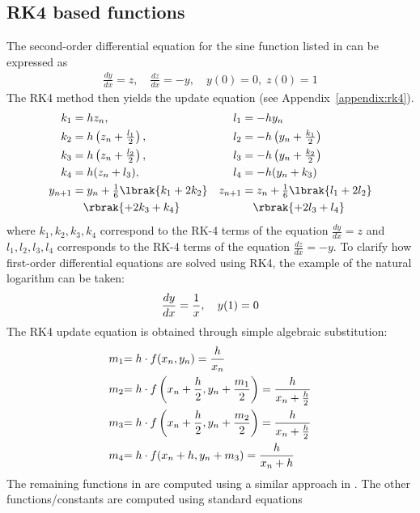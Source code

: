 \documentclass[conference]{IEEEtran}
\newcommand{\rev}[1]{{\color{black}#1}}
\begin{document}
\subsection{RK4 based functions} 
The second-order differential equation
for the sine function 
listed in 
    can be expressed as
\begin{align}
\frac{dy}{dx}=z, \quad \frac{dz}{dx}=-y, \quad y(0)=0, \; z(0)=1
\end{align}
The RK4 method then yields the update equation 
(see Appendix~\ref{appendix:rk4}).  
\begin{align}
	\begin{aligned}
k_1 &= h z_n, & l_1 &= -h y_n \\
k_2 &= h \left(z_n+\tfrac{l_1}{2}\right), & l_2 &= -h \left(y_n+\tfrac{k_1}{2}\right) \\
k_3 &= h \left(z_n+\tfrac{l_2}{2}\right), & l_3 &= -h \left(y_n+\tfrac{k_2}{2}\right) \\
k_4 &= h(z_n+l_3), & l_4 &= -h(y_n+k_3) \\
y_{n+1} &= y_n+\tfrac{1}{6}
\lbrak{k_1+2k_2} & z_{n+1} &= z_n+\tfrac{1}{6}\lbrak{l_1+2l_2}
\\
		 &\quad \rbrak{+2k_3+k_4} & &\quad \rbrak{+2l_3+l_4}
\end{aligned}
\end{align}
where $ k_1,k_2,k_3,k_4 $ correspond to the RK-4 terms of the equation $ \frac{dy}{dx}=z $ and $ l_1,l_2,l_3,l_4 $ corresponds to the RK-4 terms of the equation $ \frac{dz}{dx}=-y $. \rev{To clarify how first-order differential equations are solved using RK4, the example of the natural logarithm can be taken:}
\begin{align}
  \rev{
  \frac{dy}{dx}=\frac{1}{x}, \quad y(1)=0
}
\end{align}
\rev{The RK4 update equation is obtained through simple algebraic substitution:}  
\begin{align}
  \rev{m_{1}} &\rev{= h \cdot f(x_{n}, y_{n}) = \frac{h}{x_{n}}} \\
  \rev{m_{2}} &\rev{= h \cdot f\left(x_{n} + \frac{h}{2}, y_{n} + \frac{m_{1}}{2}\right) = \frac{h}{x_{n} + \frac{h}{2}}} \\
  \rev{m_{3}} &\rev{= h \cdot f\left(x_{n} + \frac{h}{2}, y_{n} + \frac{m_{2}}{2}\right) = \frac{h}{x_{n} + \frac{h}{2}}} \\
  \rev{m_{4}} &\rev{= h \cdot f(x_{n} + h, y_{n} + m_{3}) = \frac{h}{x_{n} + h}}
\end{align}
The remaining functions in  are computed using a similar approach in . The other functions/constants are computed using standard equations \cite{ncert12}
\end{document}
